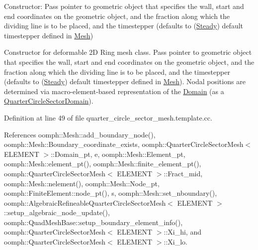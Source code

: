 Constructor\+: Pass pointer to geometric object that specifies the wall, start and end coordinates on the geometric object, and the fraction along which the dividing line is to be placed, and the timestepper (defaults to (\hyperlink{classoomph_1_1Steady}{Steady}) default timestepper defined in \hyperlink{classoomph_1_1Mesh}{Mesh}) 

Constructor for deformable 2D Ring mesh class. Pass pointer to geometric object that specifies the wall, start and end coordinates on the geometric object, and the fraction along which the dividing line is to be placed, and the timestepper (defaults to (\hyperlink{classoomph_1_1Steady}{Steady}) default timestepper defined in \hyperlink{classoomph_1_1Mesh}{Mesh}). Nodal positions are determined via macro-\/element-\/based representation of the \hyperlink{classoomph_1_1Domain}{Domain} (as a \hyperlink{classoomph_1_1QuarterCircleSectorDomain}{Quarter\+Circle\+Sector\+Domain}). 

Definition at line 49 of file quarter\+\_\+circle\+\_\+sector\+\_\+mesh.\+template.\+cc.



References oomph\+::\+Mesh\+::add\+\_\+boundary\+\_\+node(), oomph\+::\+Mesh\+::\+Boundary\+\_\+coordinate\+\_\+exists, oomph\+::\+Quarter\+Circle\+Sector\+Mesh$<$ E\+L\+E\+M\+E\+N\+T $>$\+::\+Domain\+\_\+pt, e, oomph\+::\+Mesh\+::\+Element\+\_\+pt, oomph\+::\+Mesh\+::element\+\_\+pt(), oomph\+::\+Mesh\+::finite\+\_\+element\+\_\+pt(), oomph\+::\+Quarter\+Circle\+Sector\+Mesh$<$ E\+L\+E\+M\+E\+N\+T $>$\+::\+Fract\+\_\+mid, oomph\+::\+Mesh\+::nelement(), oomph\+::\+Mesh\+::\+Node\+\_\+pt, oomph\+::\+Finite\+Element\+::node\+\_\+pt(), s, oomph\+::\+Mesh\+::set\+\_\+nboundary(), oomph\+::\+Algebraic\+Refineable\+Quarter\+Circle\+Sector\+Mesh$<$ E\+L\+E\+M\+E\+N\+T $>$\+::setup\+\_\+algebraic\+\_\+node\+\_\+update(), oomph\+::\+Quad\+Mesh\+Base\+::setup\+\_\+boundary\+\_\+element\+\_\+info(), oomph\+::\+Quarter\+Circle\+Sector\+Mesh$<$ E\+L\+E\+M\+E\+N\+T $>$\+::\+Xi\+\_\+hi, and oomph\+::\+Quarter\+Circle\+Sector\+Mesh$<$ E\+L\+E\+M\+E\+N\+T $>$\+::\+Xi\+\_\+lo.

\mbox{\label{classoomph_1_1QuarterCircleSectorMesh_af3aec899bd005cacb011c13bcb6e5f22}} 
